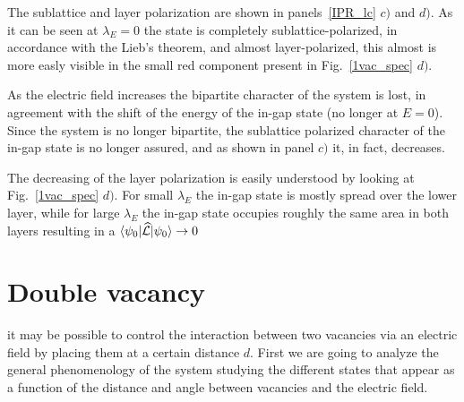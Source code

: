 The sublattice and layer polarization are shown in panels~\ref{IPR_lc} $c)$ and $d)$. As it can be seen at $\lambda_E=0$ the state is completely sublattice-polarized, in accordance with the Lieb's theorem, and almost layer-polarized, this almost is more easly visible in the small red component present in Fig.~\ref{1vac_spec} $d)$.

As the electric field increases the bipartite character of the system is lost, in agreement with the shift of the energy of the in-gap state (no longer at $E=0$). Since the system is no longer bipartite, the sublattice polarized character of the in-gap state is no longer assured, and as shown in panel $c)$ it, in fact, decreases.

The decreasing of the layer polarization is easily understood by looking at Fig.~\ref{1vac_spec} $d)$. For small $\lambda_E$ the in-gap state is mostly spread over the lower layer, while for large $\lambda_E$ the in-gap state occupies roughly the same area in both layers resulting in a $\langle\psi_0|\widehat{\mathcal{L}}|\psi_0\rangle \rightarrow 0$




\section{Double vacancy}
it may be possible to control the interaction between two vacancies via an electric field by placing them at a certain distance $d$. First we are going to analyze the general phenomenology of the system studying the different states that appear as a function of the distance and angle between vacancies and the electric field.

